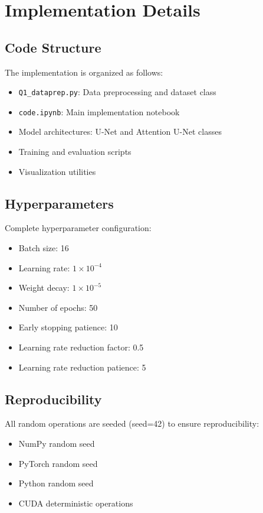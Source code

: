 \documentclass[12pt,a4paper]{article}
\begin{document}
\appendix

\section{Implementation Details}

\subsection{Code Structure}
The implementation is organized as follows:
\begin{itemize}
    \item \texttt{Q1\_dataprep.py}: Data preprocessing and dataset class
    \item \texttt{code.ipynb}: Main implementation notebook
    \item Model architectures: U-Net and Attention U-Net classes
    \item Training and evaluation scripts
    \item Visualization utilities
\end{itemize}

\subsection{Hyperparameters}
Complete hyperparameter configuration:
\begin{itemize}
    \item Batch size: 16
    \item Learning rate: $1 \times 10^{-4}$
    \item Weight decay: $1 \times 10^{-5}$
    \item Number of epochs: 50
    \item Early stopping patience: 10
    \item Learning rate reduction factor: 0.5
    \item Learning rate reduction patience: 5
\end{itemize}

\subsection{Reproducibility}
All random operations are seeded (seed=42) to ensure reproducibility:
\begin{itemize}
    \item NumPy random seed
    \item PyTorch random seed
    \item Python random seed
    \item CUDA deterministic operations
\end{itemize}
\end{document}

